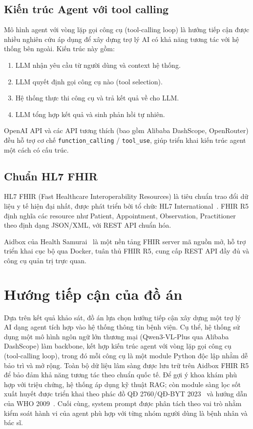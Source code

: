 \documentclass[a4paper,13pt,3p,twoside,openany]{report}
\theoremstyle{definition}
\theoremstyle{remark}
\theoremstyle{definition}
\let\ORIGsection\section
\let\ORIGsubsection\subsection
\renewcommand{\section}{\needspace{3\baselineskip}\ORIGsection}
\renewcommand{\subsection}{\needspace{3\baselineskip}\ORIGsubsection}
\begin{document}
\subsection{Kiến trúc Agent với tool calling}

Mô hình agent với vòng lặp gọi công cụ (tool-calling loop) là hướng tiếp cận được nhiều nghiên cứu áp dụng để xây dựng trợ lý AI có khả năng tương tác với hệ thống bên ngoài. Kiến trúc này gồm:

\begin{enumerate}
  \item LLM nhận yêu cầu từ người dùng và context hệ thống.
  \item LLM quyết định gọi công cụ nào (tool selection).
  \item Hệ thống thực thi công cụ và trả kết quả về cho LLM.
  \item LLM tổng hợp kết quả và sinh phản hồi tự nhiên.
\end{enumerate}

OpenAI API và các API tương thích (bao gồm Alibaba DashScope, OpenRouter) đều hỗ trợ cơ chế \texttt{function\_calling} / \texttt{tool\_use}, giúp triển khai kiến trúc agent một cách có cấu trúc.

\subsection{Chuẩn HL7 FHIR}

HL7 FHIR (Fast Healthcare Interoperability Resources) là tiêu chuẩn trao đổi dữ liệu y tế hiện đại nhất, được phát triển bởi tổ chức HL7 International~\cite{fhir-r5}. FHIR R5 định nghĩa các resource như Patient, Appointment, Observation, Practitioner theo định dạng JSON/XML, với REST API chuẩn hóa.

Aidbox của Health Samurai~\cite{aidbox} là một nền tảng FHIR server mã nguồn mở, hỗ trợ triển khai cục bộ qua Docker, tuân thủ FHIR R5, cung cấp REST API đầy đủ và công cụ quản trị trực quan.

\section{Hướng tiếp cận của đồ án}

Dựa trên kết quả khảo sát, đồ án lựa chọn hướng tiếp cận xây dựng một trợ lý AI dạng agent tích hợp vào hệ thống thông tin bệnh viện. Cụ thể, hệ thống sử dụng một mô hình ngôn ngữ lớn thương mại (Qwen3-VL-Plus qua Alibaba DashScope) làm backbone, kết hợp kiến trúc agent với vòng lặp gọi công cụ (tool-calling loop), trong đó mỗi công cụ là một module Python độc lập nhằm dễ bảo trì và mở rộng. Toàn bộ dữ liệu lâm sàng được lưu trữ trên Aidbox FHIR R5 để bảo đảm khả năng tương tác theo chuẩn quốc tế. Để gợi ý khoa khám phù hợp với triệu chứng, hệ thống áp dụng kỹ thuật RAG; còn module sàng lọc sốt xuất huyết được triển khai theo phác đồ QĐ 2760/QĐ-BYT 2023~\cite{qd2760} và hướng dẫn của WHO 2009~\cite{who2009}. Cuối cùng, system prompt được phân tách theo vai trò nhằm kiểm soát hành vi của agent phù hợp với từng nhóm người dùng là bệnh nhân và bác sĩ.
\end{document}
